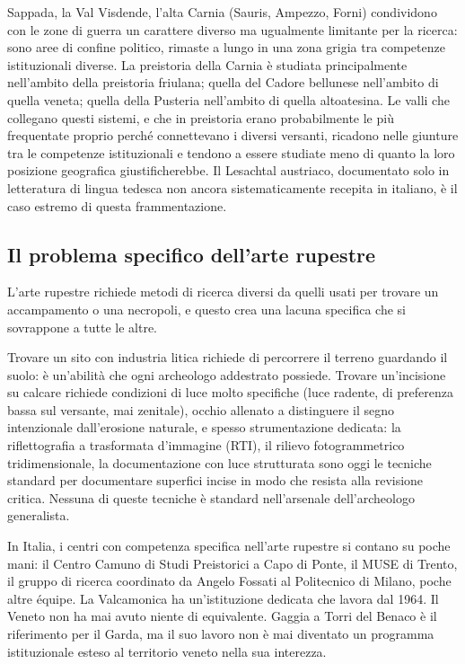 Sappada, la Val Visdende, l'alta Carnia (Sauris, Ampezzo, Forni) condividono con le zone di guerra un carattere diverso ma ugualmente limitante per la ricerca: sono aree di confine politico, rimaste a lungo in una zona grigia tra competenze istituzionali diverse. La preistoria della Carnia è studiata principalmente nell'ambito della preistoria friulana; quella del Cadore bellunese nell'ambito di quella veneta; quella della Pusteria nell'ambito di quella altoatesina. Le valli che collegano questi sistemi, e che in preistoria erano probabilmente le più frequentate proprio perché connettevano i diversi versanti, ricadono nelle giunture tra le competenze istituzionali e tendono a essere studiate meno di quanto la loro posizione geografica giustificherebbe. Il Lesachtal austriaco, documentato solo in letteratura di lingua tedesca non ancora sistematicamente recepita in italiano, è il caso estremo di questa frammentazione.

\subsection{Il problema specifico dell'arte rupestre}

L'arte rupestre richiede metodi di ricerca diversi da quelli usati per trovare un accampamento o una necropoli, e questo crea una lacuna specifica che si sovrappone a tutte le altre.

Trovare un sito con industria litica richiede di percorrere il terreno guardando il suolo: è un'abilità che ogni archeologo addestrato possiede. Trovare un'incisione su calcare richiede condizioni di luce molto specifiche (luce radente, di preferenza bassa sul versante, mai zenitale), occhio allenato a distinguere il segno intenzionale dall'erosione naturale, e spesso strumentazione dedicata: la riflettografia a trasformata d'immagine (RTI), il rilievo fotogrammetrico tridimensionale, la documentazione con luce strutturata sono oggi le tecniche standard per documentare superfici incise in modo che resista alla revisione critica. Nessuna di queste tecniche è standard nell'arsenale dell'archeologo generalista.

In Italia, i centri con competenza specifica nell'arte rupestre si contano su poche mani: il Centro Camuno di Studi Preistorici a Capo di Ponte, il MUSE di Trento, il gruppo di ricerca coordinato da Angelo Fossati al Politecnico di Milano, poche altre équipe. La Valcamonica ha un'istituzione dedicata che lavora dal 1964. Il Veneto non ha mai avuto niente di equivalente. Gaggia a Torri del Benaco è il riferimento per il Garda, ma il suo lavoro non è mai diventato un programma istituzionale esteso al territorio veneto nella sua interezza.

